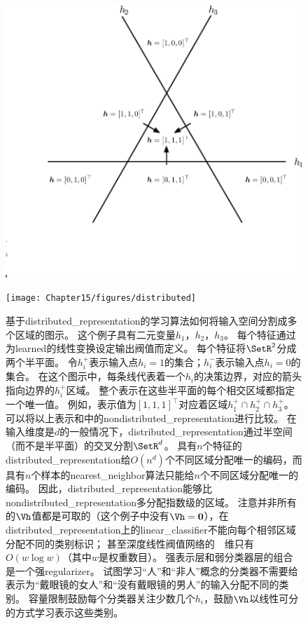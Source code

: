 \begin{figure}[!htb]
\ifOpenSource
\centerline{\includegraphics[scale=0.5]{images/134.png}}
\else
\centerline{\texttt{[image: Chapter15/figures/distributed]}}
\fi
\caption{基于\gls{distributed_representation}的学习算法如何将输入空间分割成多个区域的图示。
这个例子具有二元变量$h_1$，$h_2$，$h_3$。
每个特征通过为\gls{learned}的线性变换设定输出阀值而定义。
每个特征将$\SetR^2$分成两个半平面。
令$h_i^+$表示输入点$h_i=1$的集合；$h_i^-$表示输入点$h_i=0$的集合。
在这个图示中，每条线代表着一个$h_i$的决策边界，对应的箭头指向边界的$h_i^+$区域。
整个表示在这些半平面的每个相交区域都指定一个唯一值。
例如，表示值为$[1,1,1]^\top$对应着区域$h_1^+ \cap h_2^+ \cap h_3^+$。
可以将以上表示和中的\gls{nondistributed_representation}进行比较。
在输入维度是$d$的一般情况下，\gls{distributed_representation}通过半空间（而不是半平面）的交叉分割$\SetR^d$。
具有$n$个特征的\gls{distributed_representation}给$O(n^d)$个不同区域分配唯一的编码，而具有$n$个样本的\gls{nearest_neighbor}算法只能给$n$个不同区域分配唯一的编码。
因此，\gls{distributed_representation}能够比\gls{nondistributed_representation}多分配指数级的区域。
注意并非所有的$\Vh$值都是可取的（这个例子中没有$\Vh=\mathbf{0}$），在\gls{distributed_representation}上的\gls{linear_classifier}不能向每个相邻区域分配不同的类别标识；
甚至深度线性阀值网络的~~维只有$O(w\log w)$（其中$w$是权重数目）\citep{sontag1998vc}。
强表示层和弱分类器层的组合是一个强\gls{regularizer}。
试图学习``人''和``非人''概念的分类器不需要给表示为``戴眼镜的女人''和``没有戴眼镜的男人''的输入分配不同的类别。
容量限制鼓励每个分类器关注少数几个$h_i$，鼓励$\Vh$以线性可分的方式学习表示这些类别。
}
\label{fig:chap15_distributed}
\end{figure}

